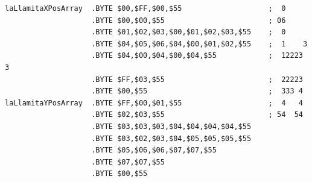 \begin{lstlisting}[caption=The paint order of pixels for 'La Llamita' in Psychedelia.]
laLlamitaXPosArray  .BYTE $00,$FF,$00,$55                    ;  0       
                    .BYTE $00,$00,$55                        ; 06      
                    .BYTE $01,$02,$03,$00,$01,$02,$03,$55    ;  0      
                    .BYTE $04,$05,$06,$04,$00,$01,$02,$55    ;  1    3 
                    .BYTE $04,$00,$04,$00,$04,$55            ;  12223 3
                    .BYTE $FF,$03,$55                        ;  22223  
                    .BYTE $00,$55                            ;  333 4  
laLlamitaYPosArray  .BYTE $FF,$00,$01,$55                    ;  4   4  
                    .BYTE $02,$03,$55                        ; 54  54  
                    .BYTE $03,$03,$03,$04,$04,$04,$04,$55
                    .BYTE $03,$02,$03,$04,$05,$05,$05,$55
                    .BYTE $05,$06,$06,$07,$07,$55
                    .BYTE $07,$07,$55
                    .BYTE $00,$55
\end{lstlisting}
\clearpage

